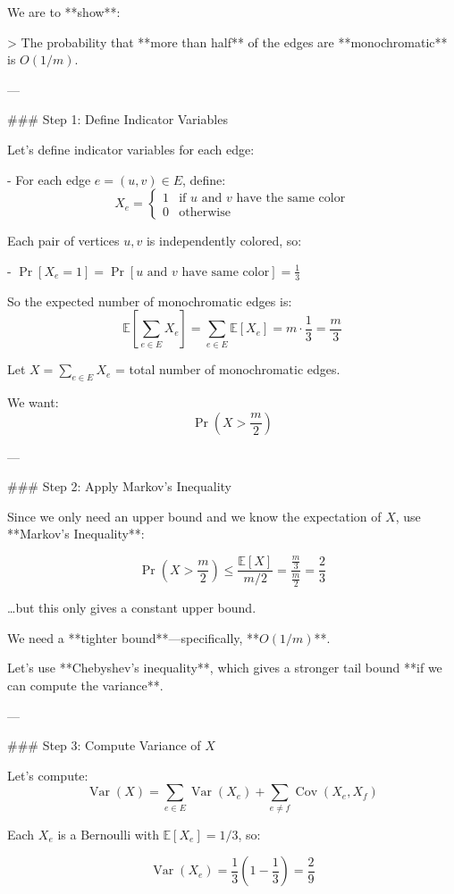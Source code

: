 We are to **show**:

> The probability that **more than half** of the edges are **monochromatic** is \( O(1/m) \).

---

### Step 1: Define Indicator Variables

Let's define indicator variables for each edge:

- For each edge \( e = (u, v) \in E \), define:
  \[
  X_e = 
  \begin{cases}
  1 & \text{if } u \text{ and } v \text{ have the same color} \\
  0 & \text{otherwise}
  \end{cases}
  \]

Each pair of vertices \( u, v \) is independently colored, so:

- \( \Pr[X_e = 1] = \Pr[u \text{ and } v \text{ have same color}] = \frac{1}{3} \)

So the expected number of monochromatic edges is:
\[
\mathbb{E}\left[\sum_{e \in E} X_e\right] = \sum_{e \in E} \mathbb{E}[X_e] = m \cdot \frac{1}{3} = \frac{m}{3}
\]

Let \( X = \sum_{e \in E} X_e \) = total number of monochromatic edges.

We want:
\[
\Pr\left(X > \frac{m}{2}\right)
\]

---

### Step 2: Apply Markov's Inequality

Since we only need an upper bound and we know the expectation of \( X \), use **Markov's Inequality**:

\[
\Pr\left(X > \frac{m}{2}\right) \le \frac{\mathbb{E}[X]}{m/2} = \frac{\frac{m}{3}}{\frac{m}{2}} = \frac{2}{3}
\]

…but this only gives a constant upper bound.

We need a **tighter bound**—specifically, **\( O(1/m) \)**.

Let's use **Chebyshev's inequality**, which gives a stronger tail bound **if we can compute the variance**.

---

### Step 3: Compute Variance of \( X \)

Let's compute:
\[
\operatorname{Var}(X) = \sum_{e \in E} \operatorname{Var}(X_e) + \sum_{e \ne f} \operatorname{Cov}(X_e, X_f)
\]

Each \( X_e \) is a Bernoulli with \( \mathbb{E}[X_e] = 1/3 \), so:

\[
\operatorname{Var}(X_e) = \frac{1}{3}\left(1 - \frac{1}{3}\right) = \frac{2}{9}
\]

